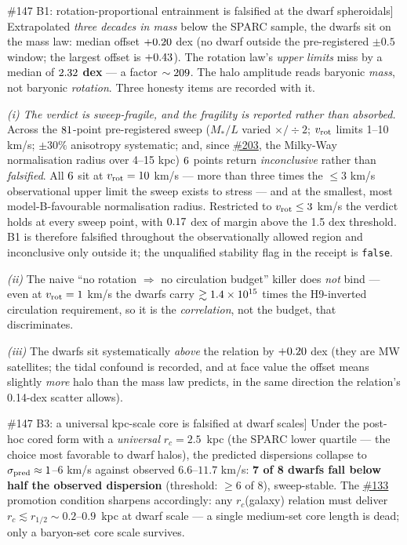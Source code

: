 \documentclass[11pt,a4paper]{article}
\providecommand{\ssvissue}[1]{\hyperref[issue:#1]{\##1}}
\begin{document}
\begin{falsbox}[\ssvissue{147} B1: rotation-proportional entrainment is
falsified at the dwarf spheroidals]
Extrapolated \emph{three decades in mass} below the SPARC sample, the
dwarfs sit on the mass law: median offset $+0.20$ dex
(no dwarf outside the pre-registered $\pm 0.5$ window; the largest
offset is $+0.43$).  The rotation law's \emph{upper
limits} miss by a median of \textbf{$2.32$ dex} --- a
factor $\sim209$.  The halo amplitude reads
baryonic \emph{mass}, not baryonic \emph{rotation}.  Three honesty
items are recorded with it.

\emph{(i) The verdict is sweep-fragile, and the fragility is
reported rather than absorbed.}  Across the
$81$-point pre-registered sweep ($M_*/L$ varied
$\times/\div 2$; $v_{\rm rot}$ limits 1--10 km/s; $\pm 30\%$
anisotropy systematic; and, since \ssvissue{203}, the Milky-Way
normalisation radius over 4--15 kpc)
$6$ points return \emph{inconclusive} rather
than \emph{falsified}.  All $6$ sit at
$v_{\rm rot} = 10$ km/s --- more than three times the $\leq 3$ km/s
observational upper limit the sweep exists to stress --- and at the
smallest, most model-B-favourable normalisation radius.  Restricted to
$v_{\rm rot} \leq 3$ km/s the verdict holds at every sweep point, with
$0.17$ dex of margin above the 1.5 dex threshold.  B1 is
therefore falsified throughout the observationally allowed region and
inconclusive only outside it; the unqualified stability flag in the
receipt is \texttt{false}.

\emph{(ii)} The naive ``no rotation $\Rightarrow$ no circulation
budget'' killer does \emph{not} bind --- even at $v_{\rm rot} = 1$ km/s
the dwarfs carry $\gtrsim 1.4\times10^{15}$ times the H9-inverted
circulation requirement, so it is the \emph{correlation}, not the
budget, that discriminates.

\emph{(iii)} The dwarfs sit systematically \emph{above} the relation by
$+0.20$ dex (they are MW satellites; the tidal confound
is recorded, and at face value the offset means slightly \emph{more}
halo than the mass law predicts, in the same direction the relation's
0.14-dex scatter allows).
\end{falsbox}

\begin{falsbox}[\ssvissue{147} B3: a universal kpc-scale core is
falsified at dwarf scales]
Under the post-hoc cored form with a \emph{universal}
$r_c = 2.5$~kpc (the SPARC lower quartile --- the choice most
favorable to dwarf halos), the predicted dispersions collapse to
$\sigma_{\rm pred} \approx 1$--$6$ km/s against observed
$6.6$--$11.7$ km/s: \textbf{7 of 8 dwarfs fall below half the observed
dispersion} (threshold: $\geq 6$ of 8), sweep-stable.  The \ssvissue{133}
promotion condition sharpens accordingly: any $r_c$(galaxy) relation
must deliver $r_c \lesssim r_{1/2} \sim 0.2$--$0.9$~kpc at dwarf scale
--- a single medium-set core length is dead; only a baryon-set core
scale survives.
\end{falsbox}
\end{document}
